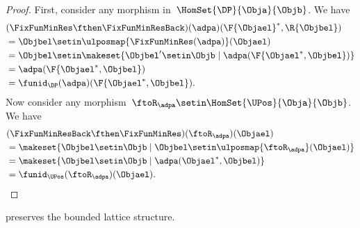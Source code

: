 \begin{proof}
    First, consider any morphism in~$\HomSet{\DP}{\Obja}{\Objb}$.
    We have
    \begin{equation}
        \begin{aligned}
             & (\FixFunMinRes \fthen \FixFunMinResBack)(\adpa)(\F{\Objael}^*,\R{\Objbel}) \\
             & = \Objbel \setin \ulposmap{\FixFunMinRes(\adpa)}(\Objael) \\
             & =\Objbel \setin \makeset{ \Objbel' \setin \Objb \mid \adpa(\F{\Objael^*,\Objbel})} \\
             & =\adpa(\F{\Objael^*,\Objbel}) \\
             & =\funid_\DP(\adpa)(\F{\Objael^*,\Objbel}).
        \end{aligned}
    \end{equation}
    Now consider any morphism~$\ftoR_\adpa \setin \HomSet{\UPos}{\Obja}{\Objb}$.
    We have
    \begin{equation}
        \begin{aligned}
             & (\FixFunMinResBack \fthen \FixFunMinRes)(\ftoR_\adpa)(\Objael) \\
             & =\makeset{ \Objbel \setin \Objb\mid \Objbel \setin \ulposmap{\ftoR_\adpa}(\Objael)} \\
             & =\makeset{ \Objbel \setin \Objb\mid \adpa(\Objael^*,\Objbel)} \\
             & =\funid_\UPos(\ftoR_\adpa)(\Objael).
        \end{aligned}
    \end{equation}

\end{proof}
\begin{lemma}
    \FixFunMinRes preserves the bounded lattice structure.
\end{lemma}
